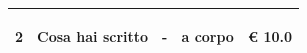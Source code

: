 \documentclass[a4paper]{article}
\begin{document}
\begin{tabular}{ | L{10mm} |  L{86mm} | L{12mm} | L{12mm} | L{16mm} | }
                            
                              \vspace{2.5mm}
                              \begin{spacing}{0}
                           2
                              \end{spacing} &
                              \vspace{2.5mm}
                              \begin{spacing}{0}
                           Cosa hai scritto
                              \end{spacing} &
                              \vspace{2.5mm}
                              \begin{spacing}{0}
                           -
                              \end{spacing} &
                              \vspace{2.5mm}
                              \begin{spacing}{0}
                           a corpo
                              \end{spacing} &
                              \vspace{2.5mm}
                              \begin{spacing}{0}
                                \euro\hfill 
                            10.0
                              \end{spacing} \\
                              \hline
            
                            
                          \end{tabular}
                          
\end{document}
